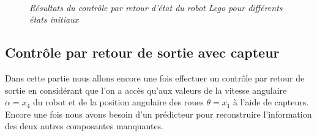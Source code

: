 \documentclass[11pt,french]{article} %
\begin{document}
\begin{figure}[H]%
	\centering
	\noindent{} \\
		\captionsetup{justification=centering}
		\caption{\textit{Résultats du contrôle par retour d'état du robot Lego pour différents états initiaux}}
		\label{fig:robot_controle}%
\end{figure}
\vspace{0.5cm}


\subsection{Contrôle par retour de sortie avec capteur}

Dans cette partie nous allons encore une fois effectuer un contrôle par retour de sortie en considérant que l'on a accès qu'aux valeurs de la vitesse angulaire $\dot\alpha = x_4$ du robot et de la position angulaire des roues $\theta = x_1$ à l'aide de capteurs. Encore une fois nous avons besoin d'un prédicteur pour reconstruire l'information des deux autres composantes manquantes. \\
\end{document}
